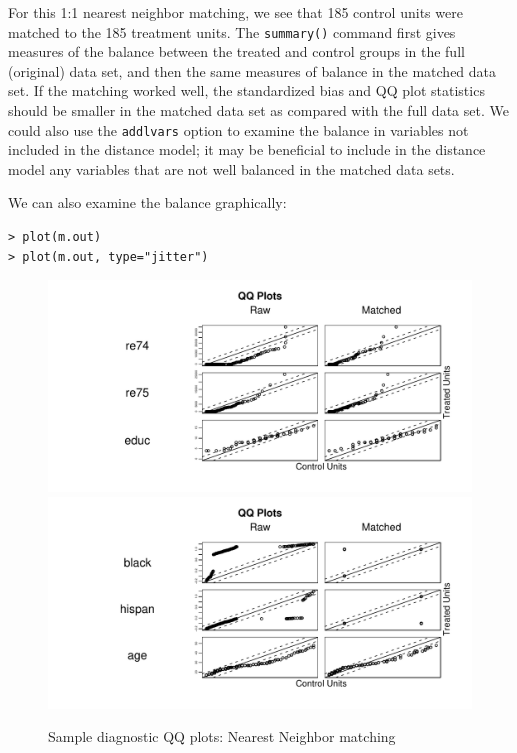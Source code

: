 \documentclass[oneside,letterpaper,titlepage]{article}
\begin{document}
For this 1:1 nearest neighbor matching, we see that 185 control units
were matched to the 185 treatment units.  The \texttt{summary()}
command first gives measures of the balance between the treated and
control groups in the full (original) data set, and then the same
measures of balance in the matched data set.  If the matching worked
well, the standardized bias and QQ plot statistics should be smaller
in the matched data set as compared with the full data set.  We could
also use the \texttt{addlvars} option to examine the balance in
variables not included in the distance model; it may be beneficial to
include in the distance model any variables that are not well balanced
in the matched data sets.

We can also examine the balance graphically:

\begin{verbatim}
> plot(m.out)
> plot(m.out, type="jitter")
\end{verbatim}

\begin{figure}[tbp]
  \begin{center}
    {\includegraphics[scale=0.5]{figs/qqplotnn}}
    {\includegraphics[scale=0.5]{figs/qqplotnn2}} \hfill
    \caption{Sample diagnostic QQ plots: Nearest Neighbor matching}
\label{diagqqnn}
\end{center}
\end{figure}
\end{document}
